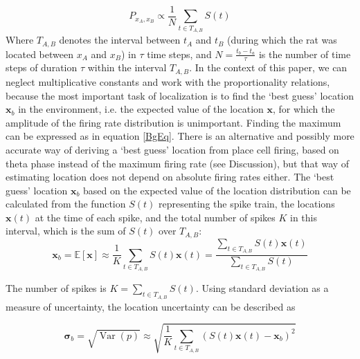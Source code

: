 \begin{equation}\label{SpkEq}
P_{x_A,x_B} \propto \frac{1}{N} \sum_{t \in T_{A,B}}{S(t)}
\end{equation} 
Where $ T_{A,B} $ denotes the interval between $ t_A $ and $ t_B $ (during which the rat was located between $ x_A $ and $ x_B $) in $ \tau $ time steps, and $ N=\frac{t_b-t_a}{\tau} $ is the number of time steps of duration $\tau$ within the interval $T_{A,B}$. In the context of this paper, we can neglect multiplicative constants and work with the proportionality relations, because the most important task of localization is to find the `best guess' location $ \boldsymbol x_b $ in the environment, i.e. the expected value of the location $ \boldsymbol x $, for which the amplitude of the firing rate distribution is unimportant. Finding the maximum can be expressed as in equation \eqref{BgEq}. There is an alternative and possibly more accurate \cite{Jensen2000} way of deriving a `best guess' location from place cell firing, based on theta phase instead of the maximum firing rate (see Discussion), but that way of estimating location does not depend on absolute firing rates either.
The `best guess' location $\boldsymbol x_b$ based on the expected value of the location distribution can be calculated from the function $S(t)$ representing the spike train, the locations $\boldsymbol x(t)$ at the time of each spike, and the total number of spikes $K$ in this interval, which is the sum of $S(t)$ over $T_{A,B}$: 
\begin{equation}\label{BgEq}
\boldsymbol x_b = \mathbb{E}[\boldsymbol x] \approx \frac{1}{K} \sum_{t \in T_{A,B}}{S(t) \boldsymbol x(t)} = \frac{\sum_{t \in T_{A,B}}{S(t) \boldsymbol x(t)}}{\sum_{t \in T_{A,B}}{S(t)}}
\end{equation} 

The number of spikes is $K=\sum_{t \in T_{A,B}}{S(t)}$. Using standard deviation as a measure of uncertainty, the location uncertainty can be described as

\begin{equation}\label{BgUnc}
\boldsymbol \sigma_b = \sqrt{\operatorname{Var}(p)} \approx \sqrt{\frac{1}{K} \sum_{t \in T_{A,B}} {(S(t) \boldsymbol x(t) - \boldsymbol x_b)^2} }
\end{equation}

